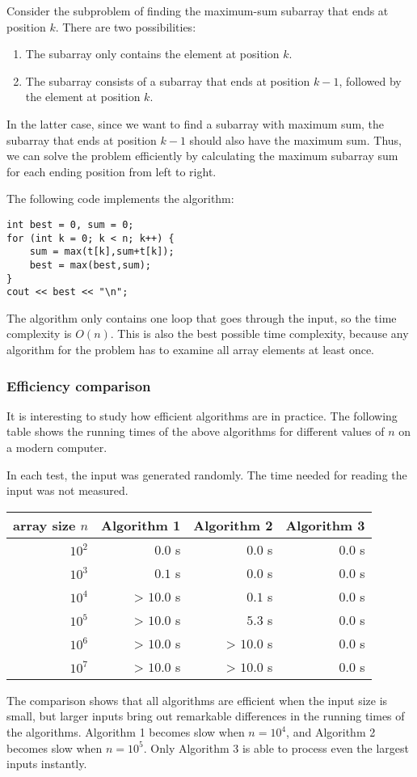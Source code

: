 Consider the subproblem of finding the maximum-sum subarray
that ends at position $k$.
There are two possibilities:
\begin{enumerate}
\item The subarray only contains the element at position $k$.
\item The subarray consists of a subarray that ends
at position $k-1$, followed by the element at position $k$.
\end{enumerate}

In the latter case, since we want to
find a subarray with maximum sum,
the subarray that ends at position $k-1$
should also have the maximum sum.
Thus, we can solve the problem efficiently
by calculating the maximum subarray sum
for each ending position from left to right.

The following code implements the algorithm:
\begin{lstlisting}
int best = 0, sum = 0;
for (int k = 0; k < n; k++) {
    sum = max(t[k],sum+t[k]);
    best = max(best,sum);
}
cout << best << "\n";
\end{lstlisting}

The algorithm only contains one loop
that goes through the input,
so the time complexity is $O(n)$.
This is also the best possible time complexity,
because any algorithm for the problem
has to examine all array elements at least once.

\subsubsection{Efficiency comparison}

It is interesting to study how efficient 
algorithms are in practice.
The following table shows the running times
of the above algorithms for different
values of $n$ on a modern computer.

In each test, the input was generated randomly.
The time needed for reading the input was not
measured.

\begin{center}
\begin{tabular}{rrrr}
array size $n$ & Algorithm 1 & Algorithm 2 & Algorithm 3 \\
\hline
$10^2$ & $0.0$ s & $0.0$ s & $0.0$ s \\
$10^3$ & $0.1$ s & $0.0$ s & $0.0$ s \\
$10^4$ & > $10.0$ s & $0.1$ s & $0.0$ s \\
$10^5$ & > $10.0$ s & $5.3$ s & $0.0$ s \\
$10^6$ & > $10.0$ s & > $10.0$ s & $0.0$ s \\
$10^7$ & > $10.0$ s & > $10.0$ s & $0.0$ s \\
\end{tabular}
\end{center}

The comparison shows that all algorithms
are efficient when the input size is small,
but larger inputs bring out remarkable
differences in the running times of the algorithms.
Algorithm 1 becomes slow
when $n=10^4$, and Algorithm 2
becomes slow when $n=10^5$.
Only Algorithm 3 is able to process
even the largest inputs instantly.
